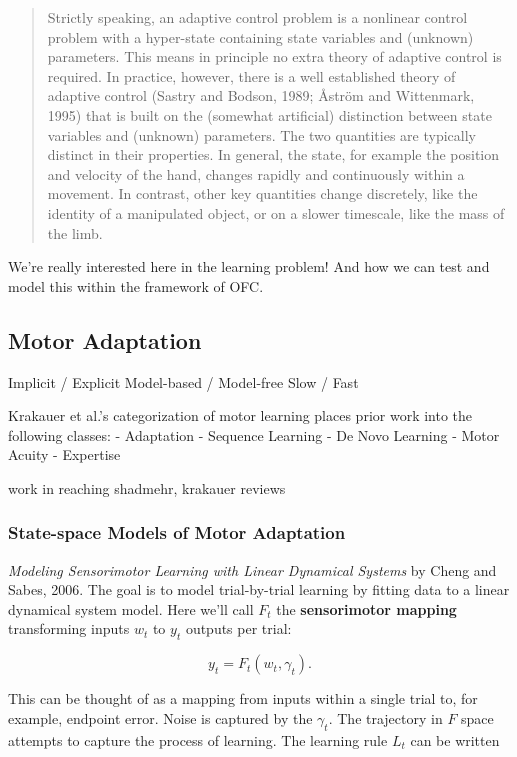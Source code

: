\documentclass[../main.tex]{subfiles}
\begin{document}
\begin{quote}
Strictly speaking, an adaptive control problem is a nonlinear control
problem with a hyper-state containing state variables and (unknown)
parameters. This means in principle no extra theory of adaptive control
is required. In practice, however, there is a well established theory of
adaptive control (Sastry and Bodson, 1989; Åström and Wittenmark, 1995)
that is built on the (somewhat artificial) distinction between state
variables and (unknown) parameters. The two quantities are typically
distinct in their properties. In general, the state, for example the
position and velocity of the hand, changes rapidly and continuously
within a movement. In contrast, other key quantities change discretely,
like the identity of a manipulated object, or on a slower timescale,
like the mass of the limb.
\end{quote}

We're really interested here in the learning problem! And how we can
test and model this within the framework of OFC.

\subsection{Motor Adaptation}\label{motor-adaptation}

Implicit / Explicit Model-based / Model-free Slow / Fast

Krakauer et al.'s categorization of motor learning places prior work
into the following classes: - Adaptation - Sequence Learning - De Novo
Learning - Motor Acuity - Expertise

work in reaching shadmehr, krakauer reviews

\subsubsection{State-space Models of Motor
Adaptation}\label{state-space-models-of-motor-adaptation}

\emph{Modeling Sensorimotor Learning with Linear Dynamical Systems} by
Cheng and Sabes, 2006. The goal is to model trial-by-trial learning by
fitting data to a linear dynamical system model. Here we'll call \(F_t\)
the \textbf{sensorimotor mapping} transforming inputs \(w_t\) to \(y_t\)
outputs per trial:

\[
y_t = F_t(w_t, \gamma_t).
\]

This can be thought of as a mapping from inputs within a single trial
to, for example, endpoint error. Noise is captured by the \(\gamma_t\).
The trajectory in \(F\) space attempts to capture the process of
learning. The learning rule \(L_t\) can be written
\end{document}
